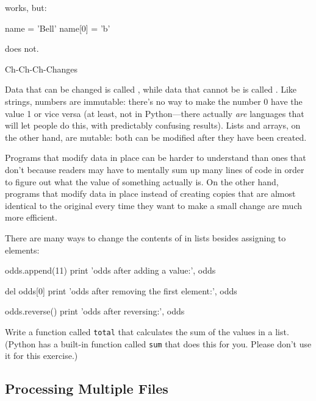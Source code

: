 works, but:

\begin{VerbIn}
name = 'Bell'
name[0] = 'b'
\end{VerbIn}

does not.

\begin{swcbox}{Ch-Ch-Ch-Changes}

Data that can be changed is called , while
data that cannot be is called . Like
strings, numbers are immutable: there's no way to make the number 0 have
the value 1 or vice versa (at least, not in Python---there actually
\emph{are} languages that will let people do this, with predictably
confusing results). Lists and arrays, on the other hand, are mutable:
both can be modified after they have been created.

Programs that modify data in place can be harder to understand than ones
that don't because readers may have to mentally sum up many lines of
code in order to figure out what the value of something actually is. On
the other hand, programs that modify data in place instead of creating
copies that are almost identical to the original every time they want to
make a small change are much more efficient.

\end{swcbox}

There are many ways to change the contents of in lists besides assigning
to elements:

\begin{VerbIn}
odds.append(11)
print 'odds after adding a value:', odds
\end{VerbIn}

\begin{VerbIn}
del odds[0]
print 'odds after removing the first element:', odds
\end{VerbIn}

\begin{VerbIn}
odds.reverse()
print 'odds after reversing:', odds
\end{VerbIn}

\begin{challenge}
  Write a function called \texttt{total} that calculates the sum of the
  values in a list. (Python has a built-in function called \texttt{sum}
  that does this for you. Please don't use it for this exercise.)
\end{challenge}

\subsection{Processing Multiple Files}

